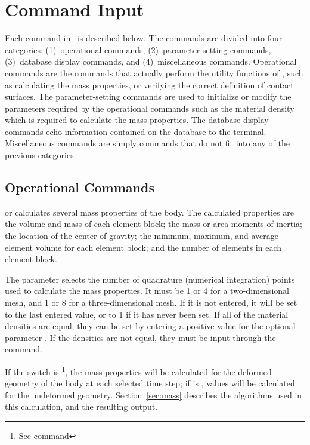 \chapter{Command Input} \label{c:commands}

Each command in \numbers\ is described below.  The commands are divided
into four categories: (1)~operational commands, (2)~parameter-setting
commands, (3)~database display commands, and (4)~miscellaneous commands.
Operational commands are the commands that actually perform the utility
functions of \numbers, such as calculating the mass properties, or
verifying the correct definition of contact surfaces.  The
parameter-setting commands are used to initialize or modify the
parameters required by the operational commands such as the material
density which is required to calculate the mass properties. The database
display commands echo information contained on the database to the
terminal.  Miscellaneous commands are simply commands that do not fit
into any of the previous categories. 



\newpage
\section{Operational Commands}\label{sec:oper}

 {
 or  calculates several mass properties of the
body.  The calculated properties are the volume and mass of each element
block; the mass or area moments of inertia; the location of the center
of gravity; the minimum, maximum, and average element volume for each
element block; and the number of elements in each element block.   

The parameter  selects the number of quadrature (numerical
integration) points used to calculate the mass properties. It must be 1
or 4 for a two-dimensional mesh, and 1 or 8 for a three-dimensional
mesh.  If it is not entered, it will be set to the last entered value,
or to 1 if it has never been set.  If all of the material densities are
equal, they can be set by entering a positive value for the optional
parameter . If the densities are not equal, they must be
input through the  command. 

If the  switch is \footnote{See command
}, the mass properties will be calculated for the deformed
geometry of the body at each selected time step; if  is
\footnotemark[1], values will be calculated for the undeformed
geometry. Section~\ref{sec:mass} describes the algorithms used in this
calculation, and the resulting output. 
} 

